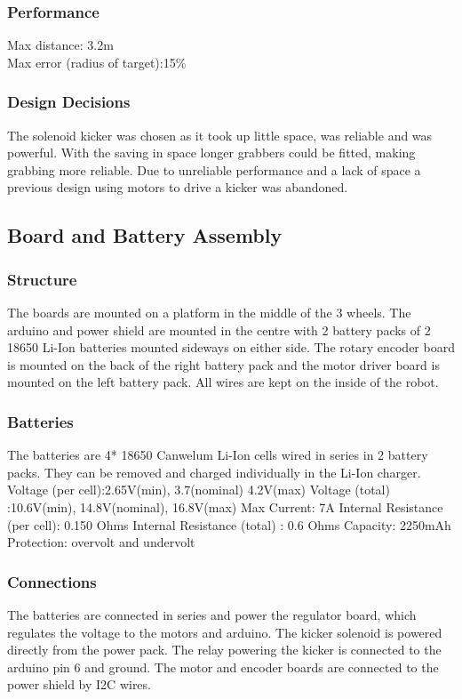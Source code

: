 \subsubsection{Performance}
Max distance: 3.2m \\
Max error (radius of target):15\%


\subsubsection{Design Decisions}
The solenoid kicker was chosen as it took up little space, was reliable and was powerful. With the saving in space longer grabbers could be fitted, making grabbing more reliable. Due to unreliable performance and a lack of space a previous design using motors to drive a kicker was abandoned.


\subsection{Board and Battery Assembly}
\subsubsection{Structure}
The boards are mounted on a platform in the middle of the 3 wheels. The arduino and power
shield are mounted in the centre with 2 battery packs of 2 18650 Li-Ion batteries mounted sideways on either side. The rotary encoder board is
mounted on the back of the right battery pack and the motor driver board is mounted
on the left battery pack. All wires are kept on the inside of the robot.

\subsubsection{Batteries}
The batteries are 4* 18650 Canwelum Li-Ion cells wired in series in 2 battery packs. They can be removed and charged individually in the Li-Ion charger.
	Voltage (per cell):2.65V(min), 3.7(nominal) 4.2V(max)
    Voltage (total)   :10.6V(min), 14.8V(nominal), 16.8V(max)
    Max Current: 7A
    Internal Resistance (per cell): 0.150 Ohms
    Internal Resistance (total)   : 0.6   Ohms
    Capacity: 2250mAh
	Protection: overvolt and undervolt   
    
\subsubsection{Connections}
The batteries are connected in series and power the regulator board, which regulates the voltage to the motors and arduino. The kicker solenoid is powered directly from the power pack. The relay powering the kicker is connected to the arduino pin 6 and ground. The motor and encoder boards are connected to the power shield by I2C wires. 
